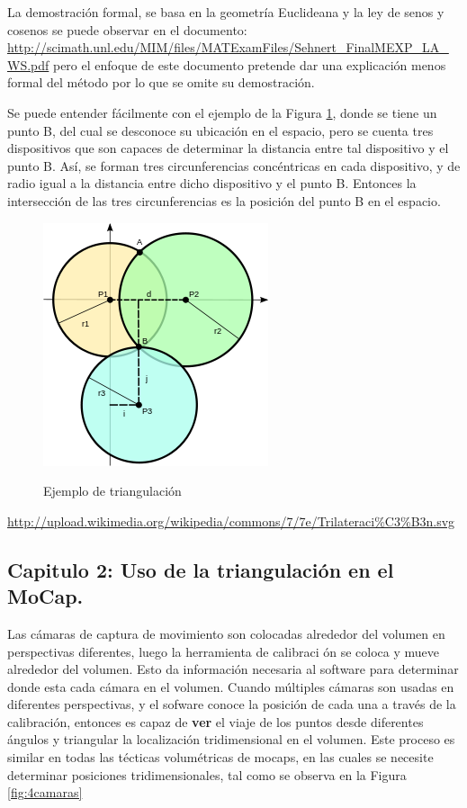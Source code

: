 \documentclass[11pt,letterpaper]{article}     %
\begin{document}
La demostraci\' on formal, se basa en la geometr\' ia Euclideana y la ley de senos y cosenos se puede observar en el documento:  \url{http://scimath.unl.edu/MIM/files/MATExamFiles/Sehnert_FinalMEXP_LA_WS.pdf}
 pero el enfoque de este documento pretende dar una explicaci\' on menos formal del m\' etodo por lo que se omite su demostraci\' on. 
 
 Se puede entender f\'  acilmente con el ejemplo de la Figura \ref{fig:ejemplo1}, donde se tiene un punto B, del cual se desconoce su ubicaci\' on en el espacio, pero se cuenta tres dispositivos que son capaces de determinar la distancia entre tal dispositivo y el punto B. As\' i, se forman tres circunferencias conc\' entricas en cada dispositivo, y de radio igual a la distancia entre dicho dispositivo y el punto B. Entonces la intersecci\' on de las tres circunferencias es la posici\' on del punto B en el espacio.

\begin{figure}[hbtp]
\caption{Ejemplo de triangulaci\' on}
\centering
\includegraphics[scale=1]{imagenes/250px-Trilateration.png}
\label{fig:ejemplo1}
\end{figure}

\url{http://upload.wikimedia.org/wikipedia/commons/7/7e/Trilateraci%C3%B3n.svg}

 

\subsection{Capitulo 2: Uso de la triangulaci\' on en el MoCap.}

Las c\' amaras de captura de movimiento son colocadas alrededor del volumen en perspectivas diferentes, luego la herramienta de calibraci \' on se coloca y mueve alrededor del volumen. Esto da informaci\' on necesaria al software para determinar donde esta cada c\' amara en el volumen. Cuando m\' ultiples c\' amaras son usadas en diferentes perspectivas, y el sofware conoce la posici\' on de cada una a trav\' es de la calibraci\' on, entonces es capaz de \textbf{ver} el viaje de los puntos desde diferentes \' angulos y triangular la localizaci\' on tridimensional en el volumen. Este proceso es similar en todas las t\' ecticas volum\' etricas de mocaps, en las cuales se necesite determinar posiciones tridimensionales, tal como se observa en la Figura \ref{fig:4camaras}
\end{document}

